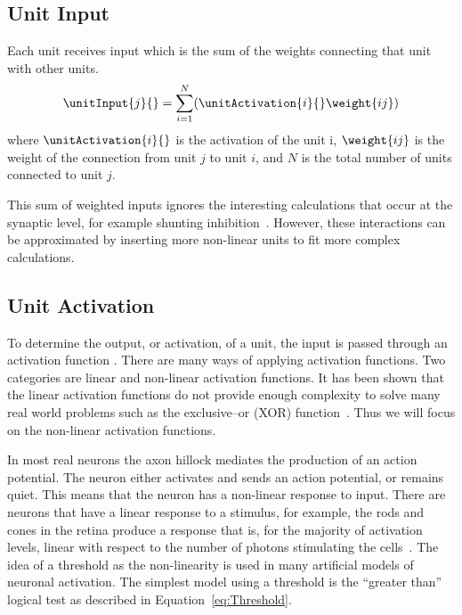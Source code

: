 \subsection{Unit Input}
Each unit receives input which is the sum of the weights connecting that unit with other units.
\begin{equation}
    \label{eq:unitInput}
    \displaystyle\unitInput{j}{} =\sum_{i=1}^{N}(\unitActivation{i}{}\weight{ij})
\end{equation}
where \(\unitActivation{i}{}\) is the activation of the unit i, \(\weight{ij}\) is the weight of the connection from unit \(j\) to unit \(i\), and \(N\) is the total number of units connected to unit $j$.

This sum of weighted inputs ignores the interesting calculations that occur at the synaptic level, for example shunting inhibition~\citep{Blomfield1974, London2005, Gasparini2006}. However, these interactions can be approximated by inserting more non-linear units to fit more complex calculations.

\subsection{Unit Activation}
To determine the output, or activation, of a unit, the input is passed through an activation function \activationFunction{}.  There are many ways of applying activation functions.  Two categories are linear and non-linear activation functions.  It has been shown that the linear activation functions do not provide enough complexity to solve many real world problems such as the exclusive--or (XOR) function~\citep{Minsky1969}.  Thus we will focus on the non-linear activation functions. 

In most real neurons the axon hillock mediates the production of an action potential. The neuron either activates and sends an action potential, or remains quiet. This means that the neuron has a non-linear response to input.  There are neurons that have a linear response to a stimulus, for example, the rods and cones in the retina produce a response that is, for the majority of activation levels, linear with respect to the number of photons stimulating the cells~\citep{Marr1979}.  The idea of a threshold as the non-linearity is used in many artificial models of neuronal activation.  The simplest model using a threshold \unitThreshold{}{} is the ``greater than'' logical test as described in Equation~\eqref{eq:Threshold}.

